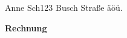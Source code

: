 \documentclass[a4paper,12pt]{letter}
\begin{document}
\obeylines


Anne Sch123
Busch Straße äöü.

\bf Rechnung

  
\end{document}
